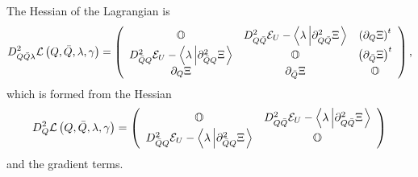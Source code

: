 \documentclass[aps,preprint]{revtex4}%
\begin{document}
The Hessian of the Lagrangian is
\begin{equation}
D_{Q\bar{Q}\lambda}^{2}\mathcal{L}\left(  Q,\bar{Q},\lambda,\gamma\right)
=\left(
\begin{array}
[c]{ccc}%
\mathbb{O} & D_{Q\bar{Q}}^{2}\mathcal{E}_{U}-\left\langle \lambda\left\vert
\partial_{Q\bar{Q}}^{2}\Xi\right.  \right\rangle  & \left(  \partial_{Q}%
\Xi\right)  ^{t}\\
D_{\bar{Q}Q}^{2}\mathcal{E}_{U}-\left\langle \lambda\left\vert \partial
_{\bar{Q}Q}^{2}\Xi\right.  \right\rangle  & \mathbb{O} & \left(
\partial_{\bar{Q}}\Xi\right)  ^{t}\\
\partial_{Q}\Xi & \partial_{\bar{Q}}\Xi & \mathbb{O}%
\end{array}
\right)  ,
\end{equation}
which is formed from the Hessian
\begin{equation}
D_{Q}^{2}\mathcal{L}\left(  Q,\bar{Q},\lambda,\gamma\right)  =\left(
\begin{array}
[c]{cc}%
\mathbb{O} & D_{Q\bar{Q}}^{2}\mathcal{E}_{U}-\left\langle \lambda\left\vert
\partial_{Q\bar{Q}}^{2}\Xi\right.  \right\rangle \\
D_{\bar{Q}Q}^{2}\mathcal{E}_{U}-\left\langle \lambda\left\vert \partial
_{\bar{Q}Q}^{2}\Xi\right.  \right\rangle  & \mathbb{O}%
\end{array}
\right)
\end{equation}
and the gradient terms.
\end{document}
